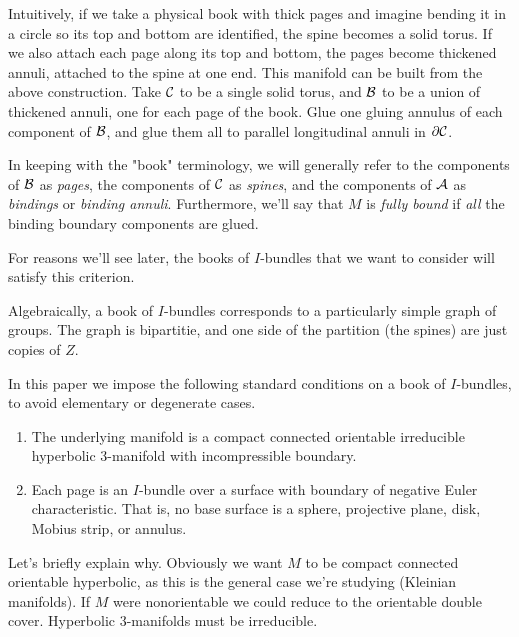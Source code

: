 
Intuitively, if we take a physical book with thick pages and imagine bending it
in a circle so its top and bottom are identified, the spine becomes a solid
torus.  If we also attach each page along its top and bottom, the pages become
thickened annuli, attached to the spine at one end. This manifold can be built
from the above construction. Take $\mathcal{C}$ to be a single solid torus, and $\mathcal{B}$
to be a union of thickened annuli, one for each page of the book. Glue one
gluing annulus of each component of $\mathcal{B}$, and glue them all to parallel
longitudinal annuli in $\partial \mathcal{C}$.

\begin{defn}

In keeping with the "book" terminology, we will generally refer to the
components of $\mathcal{B}$ as \emph{pages}, the components of $\mathcal{C}$ as \emph{spines},
and the components of $\mathcal{A}$ as \emph{bindings} or \emph{binding annuli}.
Furthermore, we'll say that $M$ is \emph{fully bound} if \emph{all} the binding
boundary components are glued.

\end{defn}

For reasons we'll see later, the books of $I$-bundles that we want to consider
will satisfy this criterion.

Algebraically, a book of $I$-bundles corresponds to a particularly simple graph
of groups. The graph is bipartitie, and one side of the partition (the spines)
are just copies of $Z$.

In this paper we impose the following standard conditions on a book of
$I$-bundles, to avoid elementary or degenerate cases.

\begin{enumerate}

\item The underlying manifold is a compact connected orientable irreducible
hyperbolic 3-manifold with incompressible boundary.

\item Each page is an $I$-bundle over a surface with boundary of negative Euler
characteristic.  That is, no base surface is a sphere, projective plane, disk,
Mobius strip, or annulus.

\end{enumerate}

Let's briefly explain why. Obviously we want $M$ to be compact connected
orientable hyperbolic, as this is the general case we're studying (Kleinian
manifolds). If $M$ were nonorientable we could reduce to the orientable double
cover. Hyperbolic 3-manifolds must be irreducible.

